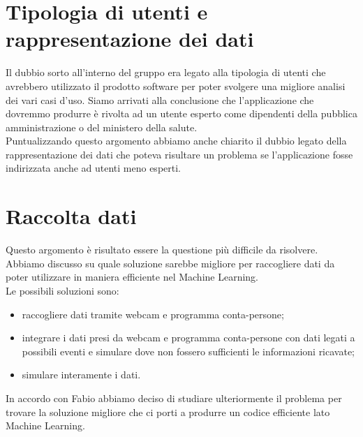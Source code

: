 \section{Tipologia di utenti e rappresentazione dei dati}
Il dubbio sorto all'interno del gruppo era legato alla tipologia di utenti che avrebbero utilizzato il prodotto software per poter svolgere una migliore analisi dei vari casi d'uso. Siamo arrivati alla conclusione che l'applicazione che dovremmo produrre è rivolta ad un utente esperto come dipendenti della pubblica amministrazione o del ministero della salute. \\
Puntualizzando questo argomento abbiamo anche chiarito il dubbio legato della rappresentazione dei dati che poteva risultare un problema se l'applicazione fosse indirizzata anche ad utenti meno esperti.
\section{Raccolta dati}
Questo argomento è risultato essere la questione più difficile da risolvere. Abbiamo discusso su quale soluzione sarebbe migliore per raccogliere dati da poter utilizzare in maniera efficiente nel Machine Learning.\\
Le possibili soluzioni sono:
\begin{itemize}
	\item raccogliere dati tramite webcam e programma conta-persone;
	\item integrare i dati presi da webcam e programma conta-persone con dati legati a possibili eventi e simulare dove non fossero sufficienti le informazioni ricavate;
	\item simulare interamente i dati.
\end{itemize}
In accordo con Fabio abbiamo deciso di studiare ulteriormente il problema per trovare la soluzione migliore che ci porti a produrre un codice efficiente lato Machine Learning.